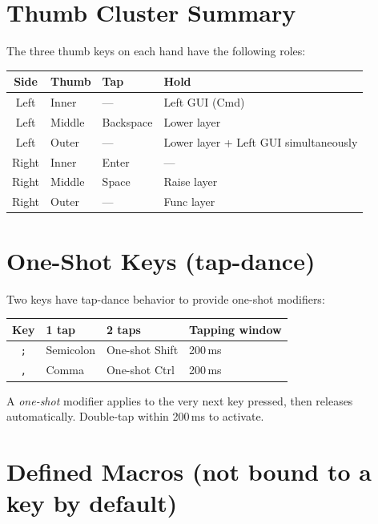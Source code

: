 \documentclass[11pt, letterpaper]{article}
\begin{document}
\section{Thumb Cluster Summary}

The three thumb keys on each hand have the following roles:

\begin{center}
\begin{tabular}{clll}
\toprule
\textbf{Side} & \textbf{Thumb} & \textbf{Tap} & \textbf{Hold} \\
\midrule
Left  & Inner  & --- & Left GUI (Cmd) \\
Left  & Middle & Backspace & Lower layer \\
Left  & Outer  & --- & Lower layer + Left GUI simultaneously \\
Right & Inner  & Enter & --- \\
Right & Middle & Space & Raise layer \\
Right & Outer  & --- & Func layer \\
\bottomrule
\end{tabular}
\end{center}

\section{One-Shot Keys (tap-dance)}

Two keys have tap-dance behavior to provide one-shot modifiers:

\begin{center}
\begin{tabular}{clll}
\toprule
\textbf{Key} & \textbf{1 tap} & \textbf{2 taps} & \textbf{Tapping window} \\
\midrule
\texttt{;} & Semicolon & One-shot Shift & 200\,ms \\
\texttt{,} & Comma     & One-shot Ctrl  & 200\,ms \\
\bottomrule
\end{tabular}
\end{center}

A \emph{one-shot} modifier applies to the very next key pressed, then
releases automatically. Double-tap within 200\,ms to activate.

\section{Defined Macros (not bound to a key by default)}
\end{document}
